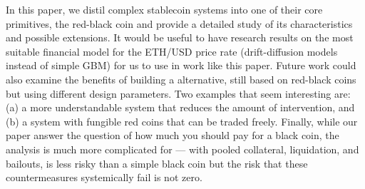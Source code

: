 In this paper, we distil complex stablecoin systems into one of their core primitives, the red-black coin and provide a detailed study of its characteristics and possible extensions. It would be useful to have research results on the most suitable financial model for the ETH/USD price rate (\eg drift-diffusion models instead of simple GBM) for us to use in work like this paper. Future work could also examine the benefits of building a \dai alternative, still based on red-black coins but using different design parameters. Two examples that seem interesting are: (a) a more understandable system that reduces the amount of intervention, and (b) a system with fungible red coins that can be traded freely. Finally, while our paper answer the question of how much you should pay for a black coin, the analysis is much more complicated for \dai --- with pooled collateral, liquidation, and bailouts, \dai is less risky than a simple black coin but the risk that these countermeasures systemically fail is not zero.

